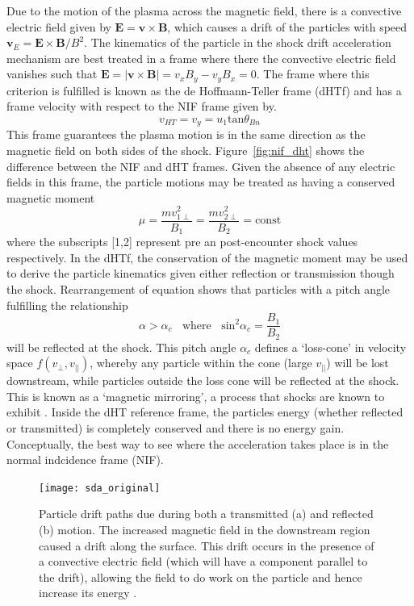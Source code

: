 Due to the motion of the plasma across the magnetic field, there is a convective electric field given by $\mathbf{E} = \mathbf{v}\times \mathbf{B}$, which causes a drift of the particles with speed $\mathbf{v}_E = \mathbf{E}\times \mathbf{B}/B^2$. The kinematics of the particle in the shock drift acceleration mechanism are best treated in a frame where there the convective electric field vanishes such that $\mathbf{E} = |\mathbf{v}\times \mathbf{B}|=v_x B_y - v_yB_x = 0$. The frame where this criterion is fulfilled is known as the de Hoffmann-Teller frame (dHTf) \citep{dehoffmann1950} and has a frame velocity with respect to the NIF frame given by. 
\begin{equation}
v_{HT} = v_y = u_1\mathrm{tan}\theta_{Bn}
\end{equation}
This frame guarantees the plasma motion is in the same direction as the magnetic field on both sides of the shock. Figure~\ref{fig:nif_dht} shows the difference between the NIF and dHT frames. Given the absence of any electric fields in this frame, the particle motions may be treated as having a conserved magnetic moment \citep{ball2001}
\begin{equation}
\mu = \frac{mv^2_{1\perp}}{B_1} = \frac{mv^2_{2\perp}}{B_2} = \mathrm{const}
\label{eqn:ad_in}
\end{equation}
where the subscripts [1,2] represent pre an post-encounter shock values respectively. In the dHTf, the conservation of the magnetic moment may be used to derive the particle kinematics given either reflection or transmission though the shock. Rearrangement of equation \label{eqn:ad_in} shows that particles with a pitch angle fulfilling the relationship
\begin{equation}
\alpha > \alpha_c~~~~\mathrm{where}~~~~\mathrm{sin}^2\alpha_c = \frac{B_1}{B_2}
\end{equation}
will be reflected at the shock. This pitch angle $\alpha_c$ defines a \textquoteleft loss-cone' in velocity space $f(v_{\perp}, v_{||})$, whereby any particle within the cone (large $v_{||}$) will be lost downstream, while particles outside the loss cone will be reflected at the shock. This is known as a \textquoteleft magnetic mirroring', a process that shocks are known to exhibit \citep{feldman1983}. Inside the dHT reference frame, the particles energy (whether reflected or transmitted) is completely conserved and there is no energy gain. Conceptually, the best way to see where the acceleration takes place is in the normal indcidence frame (NIF).
\begin{figure}[!t] 
\begin{center}
\texttt{[image: sda\_original]}
\caption[Shock drift acceleration]{Particle drift paths due during both a transmitted (a) and reflected (b) motion. The increased magnetic field in the downstream region caused a drift along the surface. This drift occurs in the presence of a convective electric field (which will have a component parallel to the drift), allowing the field to do work on the particle and hence increase its energy \citep{ball2001}.}
\label{fig:sda}
\end{center}
\end{figure}
